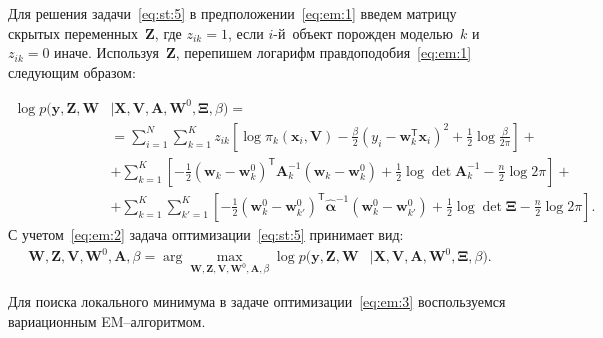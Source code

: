 \documentclass[12pt, twoside]{article}
\numberwithin{equation}{section}
\begin{document}
Для решения задачи~\eqref{eq:st:5} в предположении~\eqref{eq:em:1} введем матрицу скрытых переменных~$\mathbf{Z}$, где $z_{ik} = 1$, если $i$-й~объект порожден моделью~$k$ и~$z_{ik} = 0$ иначе. Используя~$\mathbf{Z}$, перепишем логарифм правдоподобия~\eqref{eq:em:1} следующим образом:

\begin{equation}
\label{eq:em:2}
\begin{aligned}
\log p\bigr(\mathbf{y}, \mathbf{Z}, \mathbf{W}&|\mathbf{X}, \mathbf{V}, \textbf{A}, \textbf{W}^{0},  \bm{\Xi}, \beta\bigr) =\\
&= \sum_{i=1}^{N}\sum_{k=1}^{K}z_{ik}\left[\log\pi_k\left(\textbf{x}_i, \textbf{V}\right) - \frac{\beta}{2}\left(y_{i} - \textbf{w}_{k}^{\mathsf{T}}\textbf{x}_{i}\right)^{2} + \frac{1}{2}\log\frac{\beta}{2\pi}\right] +\\
&+ \sum_{k=1}^{K}\left[-\frac{1}{2}\left(\textbf{w}_{k} - \textbf{w}_{k}^{0}\right)^{\mathsf{T}}\textbf{A}_{k}^{-1}\left(\textbf{w}_{k} - \textbf{w}_{k}^{0}\right) + \frac{1}{2}\log\det\textbf{A}^{-1}_{k} - \frac{n}{2}\log2\pi\right]+\\
&+ \sum_{k=1}^{K}\sum_{k'=1}^{K}\left[-\frac{1}{2}\left(\textbf{w}_{k}^{0}-\textbf{w}_{k'}^{0}\right)^{\mathsf{T}}\hat{\bm{\alpha}}^{-1}\left(\textbf{w}_{k}^{0}-\textbf{w}_{k'}^{0}\right) +\frac{1}{2}\log\det \bm{\Xi} -\frac{n}{2}\log{2\pi}\right].
\end{aligned}
\end{equation}
С учетом~\eqref{eq:em:2} задача оптимизации~\eqref{eq:st:5} принимает вид:
\begin{equation}
\label{eq:em:3}
\begin{aligned}
\mathbf{W}, \mathbf{Z}, \mathbf{V}, \mathbf{W}^0, \textbf{A},  \beta = \arg\max_{\mathbf{W}, \mathbf{Z}, \mathbf{V}, \mathbf{W}^0, \textbf{A}, \beta} \log p\bigr(\mathbf{y}, \mathbf{Z}, \mathbf{W}&|\mathbf{X}, \mathbf{V}, \textbf{A}, \textbf{W}^{0}, \bm{\Xi}, \beta\bigr).
\end{aligned}
\end{equation}

Для поиска локального минимума в задаче оптимизации~\eqref{eq:em:3} воспользуемся вариационным EM--алгоритмом.
\end{document}
